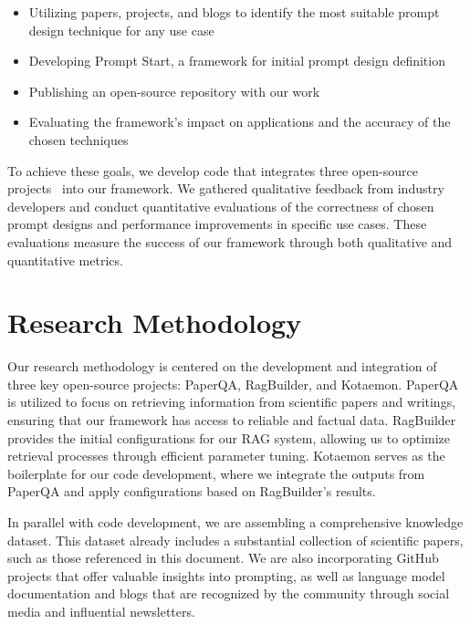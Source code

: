 \documentclass[12pt,twoside,english]{article}
\begin{document}
\vspace{0.5em}
\begin{itemize}[label=$\bullet$, leftmargin=1.5em, itemsep=0.2em, parsep=0em]
    \item Utilizing papers, projects, and blogs to identify the most suitable prompt design technique for any use case
    \item Developing Prompt Start, a framework for initial prompt design definition
    \item Publishing an open-source repository with our work
    \item Evaluating the framework's impact on applications and the accuracy of the chosen techniques
\end{itemize}

\vspace{0.5em}

To achieve these goals, we develop code that integrates three open-source projects~\cite{Skarlinski2024PaperQA,KruxAI2024RagBuilder,Cinnamon2024Kotaemon} into our framework. We gathered qualitative feedback from industry developers and conduct quantitative evaluations of the correctness of chosen prompt designs and performance improvements in specific use cases. These evaluations measure the success of our framework through both qualitative and quantitative metrics.

\section{Research Methodology}

Our research methodology is centered on the development and integration of three key open-source projects: PaperQA, RagBuilder, and Kotaemon. PaperQA is utilized to focus on retrieving information from scientific papers and writings, ensuring that our framework has access to reliable and factual data. RagBuilder provides the initial configurations for our RAG system, allowing us to optimize retrieval processes through efficient parameter tuning. Kotaemon serves as the boilerplate for our code development, where we integrate the outputs from PaperQA and apply configurations based on RagBuilder's results.

In parallel with code development, we are assembling a comprehensive knowledge dataset. This dataset already includes a substantial collection of scientific papers, such as those referenced in this document. We are also incorporating GitHub projects that offer valuable insights into prompting, as well as language model documentation and blogs that are recognized by the community through social media and influential newsletters.
\end{document}
